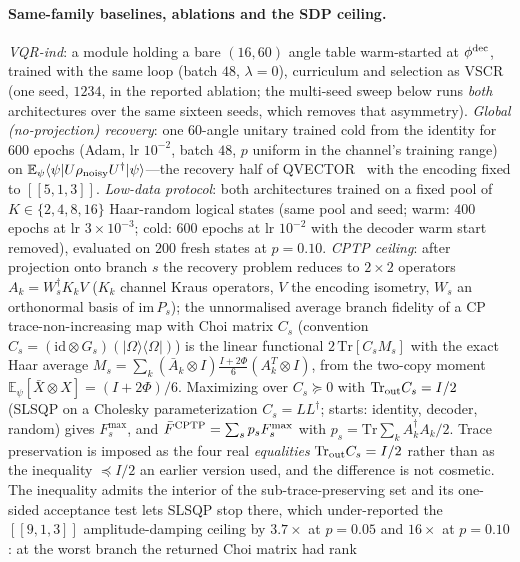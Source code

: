 \documentclass[aps,prxquantum,reprint,superscriptaddress]{revtex4-2}
\newcommand{\ket}[1]{\lvert #1\rangle}
\newcommand{\bra}[1]{\langle #1\rvert}
\newcommand{\code}{[\![5,1,3]\!]}
\begin{document}
\paragraph{Same-family baselines, ablations and the SDP ceiling.}
\emph{VQR-ind}: a module holding a bare $(16,60)$ angle table warm-started
at $\phi^{\rm dec}$, trained with the same loop (batch $48$, $\lambda=0$),
curriculum and selection as VSCR (one seed, $1234$, in the reported ablation;
the multi-seed sweep below runs \emph{both} architectures over the same sixteen
seeds, which removes that asymmetry). \emph{Global (no-projection) recovery}:
one $60$-angle unitary trained
cold from the identity for $600$ epochs (Adam, lr $10^{-2}$, batch $48$,
$p$ uniform in the channel's training range) on
$\mathbb{E}_\psi\langle\psi|U\rho_{\rm noisy}U^\dagger|\psi\rangle$---the
recovery half of QVECTOR~\cite{johnson_qvector} with the encoding fixed to
$\code$. \emph{Low-data protocol}: both architectures trained on a fixed
pool of $K\in\{2,4,8,16\}$ Haar-random logical states (same pool and seed;
warm: $400$ epochs at lr $3\times10^{-3}$; cold: $600$ epochs at lr
$10^{-2}$ with the decoder warm start removed), evaluated on $200$ fresh
states at $p=0.10$. \emph{CPTP ceiling}: after projection onto branch $s$
the recovery problem reduces to $2\times2$ operators $A_k=W_s^\dagger K_k V$
($K_k$ channel Kraus operators, $V$ the encoding isometry, $W_s$ an
orthonormal basis of $\mathrm{im}\,P_s$); the unnormalised average branch
fidelity of a CP trace-non-increasing map with Choi matrix $C_s$ (convention
$C_s=(\mathrm{id}\otimes G_s)(\ket\Omega\bra\Omega)$) is the linear
functional $2\,\mathrm{Tr}[C_s M_s]$ with the exact Haar average
$M_s=\sum_k(\bar A_k\otimes I)\tfrac{I+2\Phi}{6}(A_k^{T}\otimes I)$, from
the two-copy moment $\mathbb{E}_\psi[\bar X\otimes X]=(I+2\Phi)/6$.
Maximizing over $C_s\succeq0$ with $\mathrm{Tr}_{\rm out}C_s= I/2$
(SLSQP on a Cholesky parameterization $C_s=LL^\dagger$; starts: identity,
decoder, random) gives $F_s^{\max}$, and
$\bar F^{\rm CPTP}=\sum_s p_s F_s^{\max}$ with
$p_s=\mathrm{Tr}\sum_k A_k^\dagger A_k/2$. Trace preservation is imposed as the
four real \emph{equalities} $\mathrm{Tr}_{\rm out}C_s=I/2$ rather than as the
inequality $\preceq I/2$ an earlier version used, and the difference is not
cosmetic. The inequality admits the interior of the sub-trace-preserving set and
its one-sided acceptance test lets SLSQP stop there, which under-reported the
$[\![9,1,3]\!]$ amplitude-damping ceiling by $3.7\times$ at $p=0.05$ and
$16\times$ at $p=0.10$: at the worst branch the returned Choi matrix had rank
\end{document}
